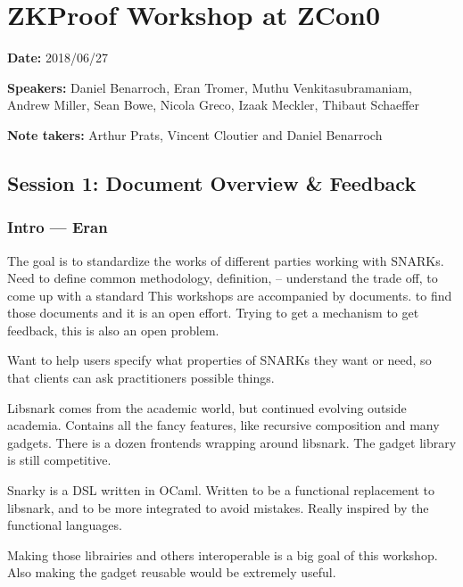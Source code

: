 \chapter[ZCon0]{ZKProof Workshop at ZCon0}
\label{chap:zcon0}

\textbf{Date:} 2018/06/27

\textbf{Speakers:} Daniel Benarroch, Eran Tromer, Muthu Venkitasubramaniam, Andrew Miller, Sean
Bowe, Nicola Greco, Izaak Meckler, Thibaut Schaeffer

\textbf{Note takers:} Arthur Prats, Vincent Cloutier and Daniel Benarroch


\section{Session 1: Document Overview \& Feedback}
\label{sec:zcon0:session1-overview}

\subsection{Intro --- Eran}
\label{sec:zcon0:session1-overview:intro}

The goal is to standardize the works of different parties working with SNARKs. Need to define
common methodology, definition, -- understand the trade off, to come up with a standard
This workshops are accompanied by documents.  to find those documents and it is
an open effort. Trying to get a mechanism to get feedback, this is also an open problem.

Want to help users specify what properties of SNARKs they want or need, so that clients can
ask practitioners possible things.

Libsnark comes from the academic world, but continued evolving outside academia. Contains
all the fancy features, like recursive composition and many gadgets. There is a dozen frontends
wrapping around libsnark. The gadget library is still competitive.

Snarky is a DSL written in OCaml. Written to be a functional replacement to libsnark, and to be
more integrated to avoid mistakes. Really inspired by the functional languages.

Making those librairies and others interoperable is a big goal of this workshop. Also making the
gadget reusable would be extremely useful.



